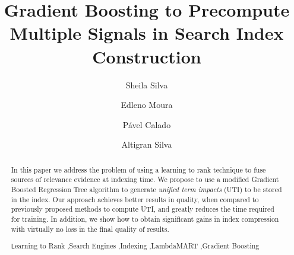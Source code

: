 \documentclass[preprint,review,10pt,3p]{elsarticle}
\begin{document}
\begin{frontmatter}



\title{Gradient Boosting to Precompute Multiple Signals in Search Index Construction}

\author[mymainaddress]{Sheila Silva}
\author[mymainaddress]{Edleno Moura}
\author[mysecondaryaddress]{P{\'a}vel Calado}
\author[mymainaddress]{Altigran Silva}

\address[mymainaddress]{Universidade Federal do Amazonas, Brasil}
\address[mysecondaryaddress]{INESC-ID, Instituto Superior T{\'e}cnico, Universidade de Lisboa}


\begin{abstract}

In this paper we address the problem of using a learning to rank technique to fuse sources of relevance evidence at indexing time. We propose to use a modified Gradient Boosted Regression Tree algorithm to generate \textit{unified term impacts} (UTI) to be stored in the index.
Our approach achieves better results in quality, when compared to previously proposed methods to compute UTI, and greatly reduces the time required for training. In addition, we show how to obtain significant gains in index compression with virtually no loss in the final quality of results.


\begin{keyword}
\texttt Learning to Rank \sep Search Engines \sep Indexing \sep LambdaMART \sep Gradient Boosting
\end{keyword}

\end{abstract}
\end{frontmatter}
\end{document}
